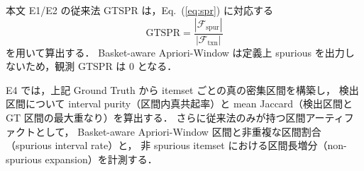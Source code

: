 本文 E1/E2 の従来法 GTSPR は，Eq.~(\ref{eq:spr}) に対応する
\[
\mathrm{GTSPR}
= \frac{|\mathcal{F}_{\text{spur}}|}{|\mathcal{F}_{\text{txn}}|}
\]
を用いて算出する．
Basket-aware Apriori-Window は定義上 spurious を出力しないため，観測 GTSPR は 0 となる．

E4 では，上記 Ground Truth から itemset ごとの真の密集区間を構築し，
検出区間について interval purity（区間内真共起率）と
mean Jaccard（検出区間と GT 区間の最大重なり）を算出する．
さらに従来法のみが持つ区間アーティファクトとして，
Basket-aware Apriori-Window 区間と非重複な区間割合（spurious interval rate）と，
非 spurious itemset における区間長増分（non-spurious expansion）を計測する．
